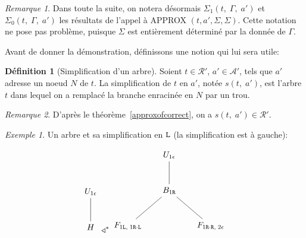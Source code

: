 \documentclass[11pt,a4paper]{article}
\theoremstyle{plain}
\theoremstyle{definition}
\newtheorem{definition}{Définition}
\theoremstyle{remark}
\newtheorem{remark}{Remarque}
\newtheorem{example}{Exemple}
\newcommand*{\sequent}{\Gamma}
\newcommand*{\Left}{\textnormal{\texttt{L}}}
\newcommand*{\Right}{\textnormal{\texttt{R}}}
\newcommand*{\treeaddresses}{\ensuremath{\mathcal{A'}}}
\newcommand*{\representationspartial}{\ensuremath{\mathcal{R'}}}
\newcommand*{\relapprox}{\ensuremath{\triangleleft}}
\newcommand*{\relapproxlarge}{\ensuremath{\relapprox^*}}
\newcommand*{\unknown}{H}
\newcommand*{\lowapprox}{\ensuremath{\Sigma_0}}
\newcommand*{\highapprox}{\ensuremath{\Sigma_1}}
\newcommand*{\treesimplify}{\ensuremath{s}}
\begin{document}
\begin{remark}
    Dans toute la suite, on notera désormais $\highapprox \left( t, \; \sequent, \; a' \right)$ et $\lowapprox \left( t, \; \sequent, \; a' \right)$ les résultats de l'appel à APPROX $(t, a', \Sigma, \Sigma)$. Cette notation ne pose pas problème, puisque $\Sigma$ est entièrement déterminé par la donnée de $\sequent$.
\end{remark}

Avant de donner la démonstration, définissons une notion qui lui sera utile:

\begin{definition}[Simplification d'un arbre]
    Soient $t \in \representationspartial$, $a' \in \treeaddresses$, tels que $a'$ adresse un noeud $N$ de $t$. La simplification de $t$ en $a'$, notée $\treesimplify(t, \; a')$, est l'arbre $t$ dans lequel on a remplacé la branche enracinée en $N$ par un trou. 
\end{definition}

\begin{remark}
    D'après le théorème~\ref{approxofcorrect}, on a $\treesimplify(t, \; a') \in \representationspartial$.
\end{remark}

\begin{example}
    Un arbre et sa simplification en $\Left$ (la simplification est à gauche):

        \begin{equation*}
        \begin{tikzpicture}%
            [level 2/.style={sibling distance=3.5cm}]
            \node {$U_{1 \epsilon}$}
            child {node {$\unknown$}
            };
        \end{tikzpicture}
        \relapproxlarge
        \begin{tikzpicture}%
            [level 2/.style={sibling distance=3.5cm}]
            \node {$U_{1 \epsilon}$}
            child {node {$B_{1 \Right}$}
                child {node {$F_{1 \Left, \; 1 \Right \cdot \Left}$}}
                child {node {$F_{1 \Right \cdot \Right, \; 2 \epsilon}$}}
            };
        \end{tikzpicture}
    \end{equation*}
\end{example}
\end{document}
